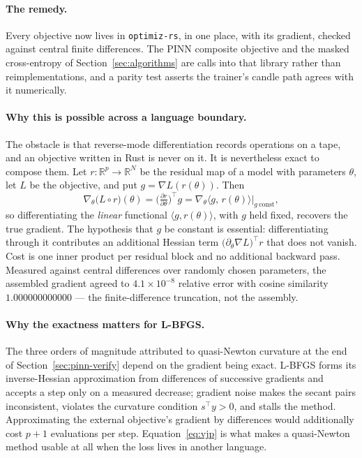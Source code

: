 \documentclass[11pt,a4paper]{article}
\theoremstyle{plain}
\theoremstyle{definition}
\begin{document}
\paragraph{The remedy.} Every objective now lives in \texttt{optimiz-rs}, in
one place, with its gradient, checked against central finite differences. The
PINN composite objective and the masked cross-entropy of
Section~\ref{sec:algorithms} are calls into that library rather than
reimplementations, and a parity test asserts the trainer's candle path agrees
with it numerically.

\paragraph{Why this is possible across a language boundary.} The obstacle is
that reverse-mode differentiation records operations on a tape, and an
objective written in Rust is never on it. It is nevertheless exact to compose
them. Let $r:\mathbb{R}^p\to\mathbb{R}^N$ be the residual map of a model with
parameters $\theta$, let $L$ be the objective, and put
$g=\nabla L(r(\theta))$. Then
\begin{equation}
\nabla_\theta\big(L\circ r\big)(\theta)
= \Big(\tfrac{\partial r}{\partial\theta}\Big)^{\!\top} g
= \nabla_\theta\big\langle g,\,r(\theta)\big\rangle\Big|_{g\ \mathrm{const}} ,
\label{eq:vjp}
\end{equation}
so differentiating the \emph{linear} functional $\langle g,r(\theta)\rangle$,
with $g$ held fixed, recovers the true gradient. The hypothesis that $g$ be
constant is essential: differentiating through it contributes an additional
Hessian term $\big(\partial_\theta\nabla L\big)^{\!\top}r$ that does not
vanish. Cost is one inner product per residual block and no additional
backward pass. Measured against central differences over randomly chosen
parameters, the assembled gradient agreed to $4.1\times10^{-8}$ relative error
with cosine similarity $1.000000000000$ --- the finite-difference truncation,
not the assembly.

\paragraph{Why the exactness matters for L-BFGS.} The three orders of magnitude
attributed to quasi-Newton curvature at the end of
Section~\ref{sec:pinn-verify} depend on the gradient being exact.
L-BFGS forms its inverse-Hessian approximation from differences of successive
gradients and accepts a step only on a measured decrease; gradient noise makes
the secant pairs inconsistent, violates the curvature condition
$s^{\!\top}y>0$, and stalls the method. Approximating the external objective's
gradient by differences would additionally cost $p+1$ evaluations per step.
Equation~\eqref{eq:vjp} is what makes a quasi-Newton method usable at all when
the loss lives in another language.
\end{document}
